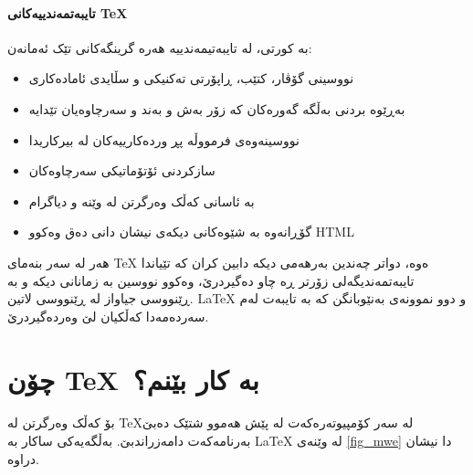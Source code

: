 \documentclass[14pt]{article}
\begin{document}
\paragraph{تایبەتمەندییەکانی \TeX}
 بە کورتی، لە تایبەتیمەندییە هەرە گرینگەکانی تێک ئەمانەن:
 
\begin{itemize}
\item نووسینی گۆڤار، کتێب، ڕاپۆرتی تەکنیکی و سڵایدی ئامادەکاری
\item بەڕێوە بردنی بەڵگە گەورەکان کە زۆر بەش و بەند و سەرچاوەیان تێدایە
\item نووسینەوەی فرمووڵە پڕ وردەکارییەکان لە بیرکاریدا
\item سازکردنی ئۆتۆماتیکی سەرچاوەکان
\item بە ئاسانی کەڵک وەرگرتن لە وێنە و دیاگرام
\item گۆڕانەوە بە شێوەکانی دیکەی نیشان دانی دەق وەکوو HTML
\end{itemize}

هەر لە سەر بنەمای
\textenglish{\TeX}
ەوە، دواتر چەندین بەرهەمی دیکە دابین کران کە تێیاندا تایبەتمەندیگەلی زۆرتر ڕە چاو دەگیردرێ، وەکوو نووسین بە زمانانی دیکە و بە ڕێنووسی جیاواز لە ڕێنووسی لاتین. 
\textenglish{\LaTeX} 
و 
\textenglish{\XeLaTeX}
دوو نموونەی بەنێوبانگن کە بە تایبەت لەم سەردەمەدا کەڵکیان لێ وەردەگیردرێ.

\section{چۆن \TeX~بە کار بێنم؟}

بۆ کەڵک وەرگرتن لە \TeX لە سەر کۆمپیوتەرەکەت لە پێش هەموو شتێک دەبێ بەرنامەکەت دامەزراندبێ. بەڵگەیەکی ساکار بە 
\textenglish{\LaTeX} 
 لە وێنەی
\ref{fig_mwe}
دا نیشان دراوە.
\end{document}
